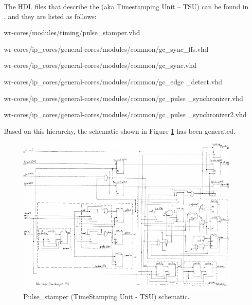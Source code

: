 \vspace{5mm} 

\noindent The HDL files that describe the  (aka Timestamping Unit – TSU) can be found in \cite{WRPC:ohwr}, and they are listed as follows:

\begin{dig}
\item wr-cores/modules/timing/pulse\_stamper.vhd
\begin{dig}
\item wr-cores/ip\_cores/general-cores/modules/common/gc\_sync\_ffs.vhd
\begin{dig}
\item wr-cores/ip\_cores/general-cores/modules/common/gc\_sync.vhd
\item wr-cores/ip\_cores/general-cores/modules/common/gc\_edge \_detect.vhd
\end{dig}
\item wr-cores/ip\_cores/general-cores/modules/common/gc\_pulse \_synchronizer.vhd
\begin{dig}
\item wr-cores/ip\_cores/general-cores/modules/common/gc\_pulse \_synchronizer2.vhd
\end{dig}
\end{dig}
\end{dig}

\noindent Based on this hierarchy, the schematic shown in Figure \ref{fig:TSU-dig} has been generated.

\begin{landscape}

\begin{figure}[H]
    \centering
    \includegraphics[width=26cm]{figures/TSU_pulse_stamper.pdf}
    \caption{Pulse\_stamper (TimeStamping Unit - TSU) schematic.}
    \label{fig:TSU-dig}
\end{figure}
\restoregeometry
\end{landscape}

